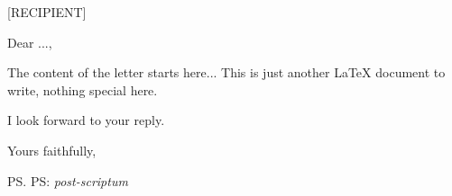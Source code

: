 \documentclass[a4paper
	,11pt
	]{letter}
\begin{document}
\pagestyle{plain}
\begin{letter}{%
	[RECIPIENT]
}

\opening{Dear ...,}

The content of the letter starts here...
This is just another \LaTeX{} document to write, nothing special here.

I look forward to your reply.

\closing{Yours faithfully,}
\ps{PS: \emph{post-scriptum}}

\end{letter}
\end{document}
